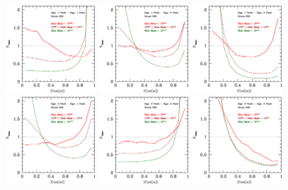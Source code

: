\documentclass[usenatbib]{mn2e}
\begin{document}
\begin{figure}
\includegraphics[width=0.30\textwidth]{../plot2/256/256_T1V1.ps}
\includegraphics[width=0.30\textwidth]{../plot2/256/256_T1V2.ps}
\includegraphics[width=0.30\textwidth]{../plot2/256/256_T1V3.ps}
\includegraphics[width=0.30\textwidth]{../plot2/256/256_T2V1.ps}
\includegraphics[width=0.30\textwidth]{../plot2/256/256_T2V2.ps}
\includegraphics[width=0.30\textwidth]{../plot2/256/256_T2V3.ps}

\end{figure}
\end{document}
